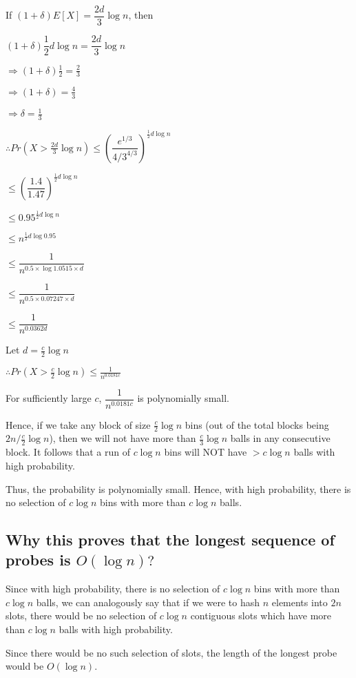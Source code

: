 \documentclass{article}
\begin{document}
If $(1+\delta)E[X] = \dfrac{2d}{3}\log{n}$, then

$(1+\delta)\dfrac{1}{2}d\log{n} = \dfrac{2d}{3}\log{n}$

$\Rightarrow (1+\delta)\frac{1}{2} = \frac{2}{3}$

$\Rightarrow (1+\delta) = \frac{4}{3}$

$\Rightarrow \delta = \frac{1}{3}$

$\therefore Pr(X > \frac{2d}{3}\log{n}) \le \left( \dfrac{e^{1/3}}{{4/3}^{4/3}} \right)^{\frac{1}{2}d\log{n}}$

$\le \left( \dfrac{1.4}{1.47} \right)^{\frac{1}{2}d\log{n}}$

$\le 0.95^{\frac{1}{2}d\log{n}}$

$\le n^{\frac{1}{2}d\log{0.95}}$

$\le \dfrac{1}{n^{0.5 \times \log{1.0515} \times d}}$

$\le \dfrac{1}{n^{0.5 \times 0.07247 \times d}}$

$\le \dfrac{1}{n^{0.0362d}}$

Let $d = \frac{c}{2}\log{n}$

$\therefore Pr(X > \frac{c}{2}\log{n}) \le \frac{1}{n^{0.0181c}}$

For sufficiently large $c$, $\dfrac{1}{n^{0.0181c}}$ is polynomially small.

Hence, if we take any block of size $\frac{c}{2}\log{n}$ bins (out of
the total blocks being ${2n}/{\frac{c}{2}\log{n}}$), then we will
not have more than $\frac{c}{3}\log{n}$ balls in any consecutive
block. It follows that a run of $c\log{n}$ bins will NOT have $>
c\log{n}$ balls with high probability.

Thus, the probability is polynomially small. Hence, with high
probability, there is no selection of $c\log{n}$ bins with more than
$c\log{n}$ balls.

\subsection{Why this proves that the longest sequence of probes
is $O(\log{n})?$}

Since with high probability, there is no selection of $c\log{n}$ bins
with more than $c\log{n}$ balls, we can analogously say that if we
were to hash $n$ elements into $2n$ slots, there would be no selection
of $c\log{n}$ contiguous slots which have more than $c\log{n}$ balls
with high probability.

Since there would be no such selection of slots, the length of the
longest probe would be $O(\log{n})$.

\clearpage
\end{document}
